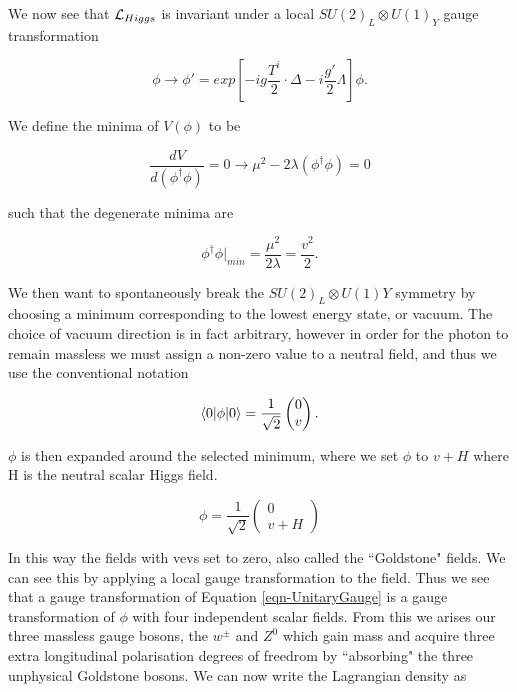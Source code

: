 We now see that $\mathcal{L}_{Higgs}$ is invariant under a local $SU(2)_L \otimes U(1)_Y$ gauge transformation 

\begin{equation}
\phi \to \phi' = exp[-ig\frac{T^i}{2}\cdot \Delta - i\frac{g'}{2}\Lambda]\phi.
\end{equation}

We define the minima of $V(\phi)$ to be 

\begin{equation}
\frac{dV}{d(\phi^\dagger\phi)} = 0 \rightarrow \mu^2 - 2\lambda(\phi^{\dagger}\phi) = 0
\end{equation}

such that the degenerate minima are

\begin{equation}
\phi^{\dagger}\phi|_{min} = \frac{\mu^2}{2\lambda} = \frac{v^2}{2}.
\end{equation}

We then want to spontaneously break the $SU(2)_L \otimes U(1)Y$ symmetry by choosing a minimum corresponding to the lowest energy state, or 
vacuum. The choice of vacuum direction is in fact arbitrary, however in order for the photon to remain massless we must assign a non-zero value 
to a neutral field, and thus we use the conventional notation

\begin{equation} \label{eqn-HiggsDoublet}
\braket{0|\phi|0} = \frac{1}{\sqrt{2}}
\begin{pmatrix}
0 \\
v
\end{pmatrix}.
\end{equation}

$\phi$ is then expanded around the selected minimum, where we set $\phi$ to $v + H$ where H is the neutral scalar Higgs field.

\begin{equation} \label{eqn-UnitaryGauge}
\phi = \frac{1}{\sqrt{2}}
\begin{pmatrix}
0 \\
v + H
\end{pmatrix}
\end{equation}

In this way the fields with vevs set to zero, also called the ``Goldstone" fields. We can see this by applying a local gauge transformation to 
the field. Thus we see that a gauge transformation of Equation \ref{eqn-UnitaryGauge} is a gauge transformation of $\phi$ with four independent 
scalar fields. From this we arises our three massless gauge bosons, the $w^{\pm}$ and $Z^0$ which gain mass and acquire three extra 
longitudinal polarisation degrees of freedrom by ``absorbing" the three unphysical Goldstone bosons. We can now write the Lagrangian density as 

